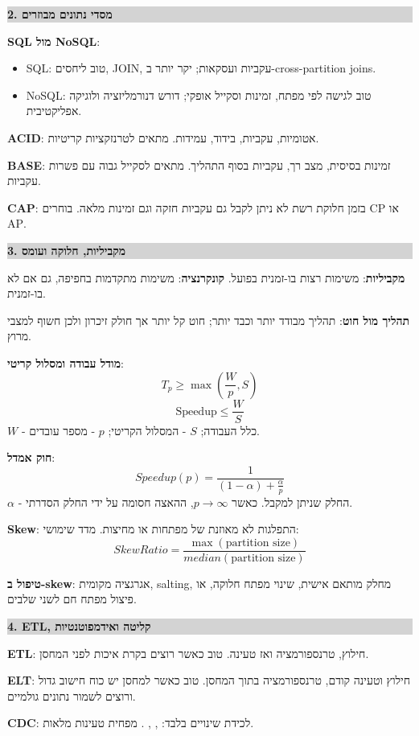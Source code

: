 \documentclass[10pt,a4paper]{article}
\newcommand{\eng}[1]{\textenglish{#1}}
\newcommand{\code}[1]{\textenglish{\texttt{\detokenize{#1}}}}
\newcommand{\term}[1]{\textbf{#1}}
\newcommand{\formula}[1]{\[
#1
\]}
\newenvironment{cheatbox}[1]{
  \vspace{2pt}
  \noindent\colorbox{lightgray}{\parbox{\dimexpr\linewidth-2\fboxsep}{\textbf{\color{sectionblue}#1}}}
  \vspace{2pt}
}{\vspace{3pt}}
\begin{document}
\begin{multicols}{2}
\begin{cheatbox}{2. מסדי נתונים מבוזרים}
\term{\eng{SQL} מול \eng{NoSQL}}:
\begin{itemize}
  \item \eng{SQL}: טוב ליחסים, \eng{JOIN}, עקביות ועסקאות; יקר יותר ב-\eng{cross-partition joins}.
  \item \eng{NoSQL}: טוב לגישה לפי מפתח, זמינות וסקייל אופקי; דורש דנורמליזציה ולוגיקה אפליקטיבית.
\end{itemize}

\term{\eng{ACID}}: אטומיות, עקביות, בידוד, עמידות. מתאים לטרנזקציות קריטיות.

\term{\eng{BASE}}: זמינות בסיסית, מצב רך, עקביות בסוף התהליך. מתאים לסקייל גבוה עם פשרות עקביות.

\term{\eng{CAP}}: בזמן חלוקת רשת לא ניתן לקבל גם עקביות חזקה וגם זמינות מלאה. בוחרים \eng{CP} או \eng{AP}.
\end{cheatbox}

\begin{cheatbox}{3. מקביליות, חלוקה ועומס}
\term{מקביליות}: משימות רצות בו-זמנית בפועל. \term{קונקרנציה}: משימות מתקדמות בחפיפה, גם אם לא בו-זמנית.

\term{תהליך מול חוט}: תהליך מבודד יותר וכבד יותר; חוט קל יותר אך חולק זיכרון ולכן חשוף למצבי מרוץ.

\term{מודל עבודה ומסלול קריטי}:
\formula{T_p\ge \max\left(\frac{W}{p},S\right)}
\formula{\text{Speedup}\le \frac{W}{S}}
$W$ - כלל העבודה; $S$ - המסלול הקריטי; $p$ - מספר עובדים.

\term{חוק אמדל}:
\formula{Speedup(p)=\frac{1}{(1-\alpha)+\frac{\alpha}{p}}}
$\alpha$ - החלק שניתן למקבל. כאשר $p\to\infty$, ההאצה חסומה על ידי החלק הסדרתי.

\term{\eng{Skew}}: התפלגות לא מאוזנת של מפתחות או מחיצות. מדד שימושי:
\formula{SkewRatio=\frac{\max(\text{partition size})}{median(\text{partition size})}}

\term{טיפול ב-\eng{skew}}: אגרגציה מקומית, \eng{salting}, מחלק מותאם אישית, שינוי מפתח חלוקה, או פיצול מפתח חם לשני שלבים.
\end{cheatbox}

\begin{cheatbox}{4. \eng{ETL}, קליטה ואידמפוטנטיות}
\term{\eng{ETL}}: חילוץ, טרנספורמציה ואז טעינה. טוב כאשר רוצים בקרת איכות לפני המחסן.

\term{\eng{ELT}}: חילוץ וטעינה קודם, טרנספורמציה בתוך המחסן. טוב כאשר למחסן יש כוח חישוב גדול ורוצים לשמור נתונים גולמיים.

\term{\eng{CDC}}: לכידת שינויים בלבד: \code{INSERT}, \code{UPDATE}, \code{DELETE}. מפחית טעינות מלאות.


\end{cheatbox}
\end{multicols}
\end{document}
